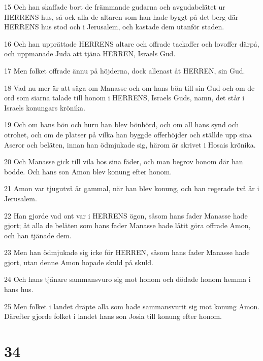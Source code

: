 \par 15 Och han skaffade bort de främmande gudarna och avgudabelätet ur HERRENS hus, så ock alla de altaren som han hade byggt på det berg där HERRENS hus stod och i Jerusalem, och kastade dem utanför staden.
\par 16 Och han upprättade HERRENS altare och offrade tackoffer och lovoffer därpå, och uppmanade Juda att tjäna HERREN, Israels Gud.
\par 17 Men folket offrade ännu på höjderna, dock allenast åt HERREN, sin Gud.
\par 18 Vad nu mer är att säga om Manasse och om hans bön till sin Gud och om de ord som siarna talade till honom i HERRENS, Israels Guds, namn, det står i Israels konungars krönika.
\par 19 Och om hans bön och huru han blev bönhörd, och om all hans synd och otrohet, och om de platser på vilka han byggde offerhöjder och ställde upp sina Aseror och beläten, innan han ödmjukade sig, härom är skrivet i Hosais krönika.
\par 20 Och Manasse gick till vila hos sina fäder, och man begrov honom där han bodde. Och hans son Amon blev konung efter honom.
\par 21 Amon var tjugutvå år gammal, när han blev konung, och han regerade två år i Jerusalem.
\par 22 Han gjorde vad ont var i HERRENS ögon, såsom hans fader Manasse hade gjort; åt alla de beläten som hans fader Manasse hade låtit göra offrade Amon, och han tjänade dem.
\par 23 Men han ödmjukade sig icke för HERREN, såsom hans fader Manasse hade gjort, utan denne Amon hopade skuld på skuld.
\par 24 Och hans tjänare sammansvuro sig mot honom och dödade honom hemma i hans hus.
\par 25 Men folket i landet dräpte alla som hade sammansvurit sig mot konung Amon. Därefter gjorde folket i landet hans son Josia till konung efter honom.

\chapter{34}


